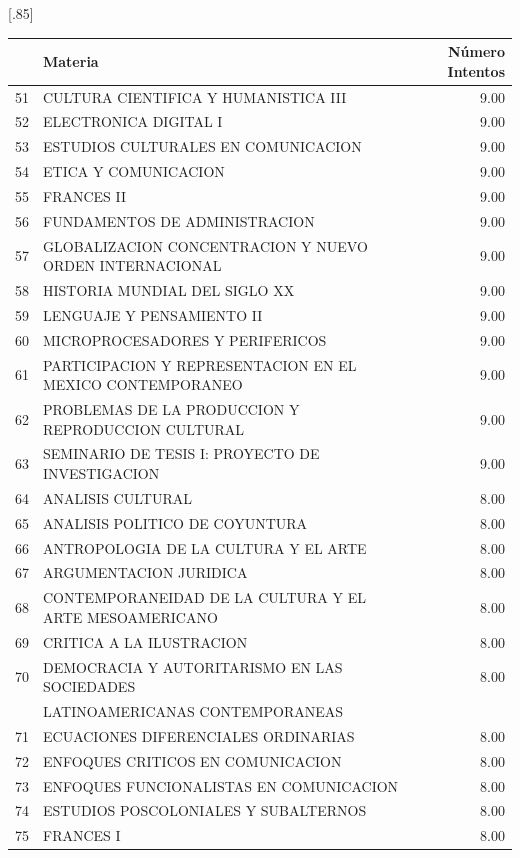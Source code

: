 \documentclass[12pt]{article}
\begin{document}
\begin{table}[ht]
\centering
\scalebox{0.75}[.85]{
\begin{tabular}{rlr}
  \hline
 & Materia & N\'umero Intentos \\ 
  \hline
  51 & CULTURA CIENTIFICA Y HUMANISTICA III & 9.00 \\ 
  52 & ELECTRONICA DIGITAL I & 9.00 \\ 
  53 & ESTUDIOS CULTURALES EN COMUNICACION & 9.00 \\ 
  54 & ETICA Y COMUNICACION & 9.00 \\ 
  55 & FRANCES II & 9.00 \\ 
    56 & FUNDAMENTOS DE ADMINISTRACION & 9.00 \\ 
  57 & GLOBALIZACION CONCENTRACION Y NUEVO ORDEN INTERNACIONAL & 9.00 \\ 
  58 & HISTORIA MUNDIAL DEL SIGLO XX & 9.00 \\ 
  59 & LENGUAJE Y PENSAMIENTO II & 9.00 \\ 
  60 & MICROPROCESADORES Y PERIFERICOS & 9.00 \\ 
  61 & PARTICIPACION Y REPRESENTACION EN EL MEXICO CONTEMPORANEO & 9.00 \\ 
  62 & PROBLEMAS DE LA PRODUCCION Y REPRODUCCION CULTURAL & 9.00 \\ 
  63 & SEMINARIO DE TESIS I: PROYECTO DE INVESTIGACION & 9.00 \\ 
  64 & ANALISIS CULTURAL & 8.00 \\ 
  65 & ANALISIS POLITICO DE COYUNTURA & 8.00 \\ 
  66 & ANTROPOLOGIA DE LA CULTURA Y EL ARTE & 8.00 \\ 
  67 & ARGUMENTACION JURIDICA & 8.00 \\ 
  68 & CONTEMPORANEIDAD DE LA CULTURA Y EL ARTE MESOAMERICANO & 8.00 \\ 
  69 & CRITICA A LA ILUSTRACION & 8.00 \\ 
  70 & DEMOCRACIA Y AUTORITARISMO EN LAS SOCIEDADES & 8.00 \\ 
  & LATINOAMERICANAS CONTEMPORANEAS & \\ 
  71 & ECUACIONES DIFERENCIALES ORDINARIAS & 8.00 \\ 
  72 & ENFOQUES CRITICOS EN COMUNICACION & 8.00 \\ 
  73 & ENFOQUES FUNCIONALISTAS EN COMUNICACION & 8.00 \\ 
  74 & ESTUDIOS POSCOLONIALES Y SUBALTERNOS & 8.00 \\ 
  75 & FRANCES I & 8.00 \\ 

\end{tabular}}
\end{table}
\end{document}
